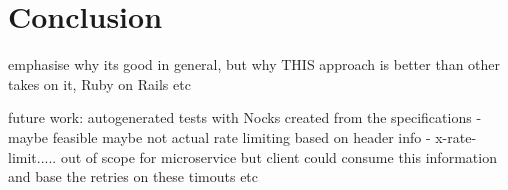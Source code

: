 \chapter{Conclusion}

emphasise why its good in general, but why THIS approach is better than other takes on it, Ruby on Rails etc

future work: autogenerated tests with Nocks created from the specifications - maybe feasible maybe not
             actual rate limiting based on header info - x-rate-limit..... out of scope for microservice but client
            could consume this information and base the retries on these timouts etc